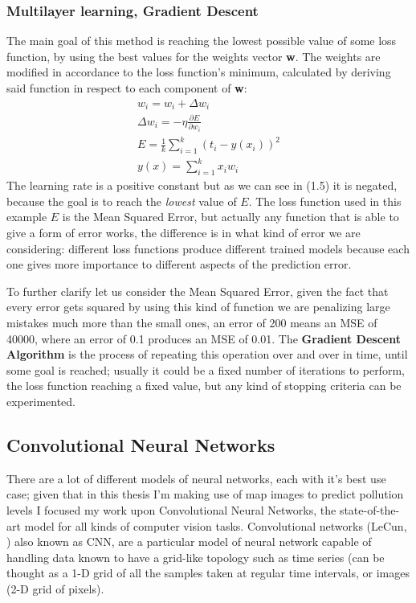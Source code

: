 \documentclass[11pt,a4paper,titlepage]{book}
\begin{document}
\subsubsection{Multilayer learning, Gradient Descent}
The main goal of this method is reaching the lowest possible value of some loss function, by using the best values for the weights vector \textbf{w}. The weights are modified in accordance to the loss function's minimum, calculated by deriving said function in respect to each component of \textbf{w}:
\begin{align}
    w_i = w_i + \Delta w_i \\
    \Delta w_i = - \eta \frac{\partial E}{\partial w_i} \\
    E = \frac{1}{k} \sum_{i=1}^{k}(t_i - y(x_i))^2 \\
    y(x) = \sum_{i=1}^{k}x_i w_i
\end{align}
The learning rate is a positive constant but as we can see in (1.5) it is negated, because the goal is to reach the \textit{lowest} value of $E$.
\newline
The loss function used in this example $E$ is the Mean Squared Error, but actually any function that is able to give a form of error works, the difference is in what kind of error we are considering: different loss functions produce different trained models because each one gives more importance to different aspects of the prediction error. 

To further clarify let us consider the Mean Squared Error, given the fact that every error gets squared by using this kind of function we are penalizing large mistakes much more than the small ones, an error of 200 means an MSE of 40000, where an error of 0.1 produces an MSE of 0.01. 
\newline
\newline
The \textbf{Gradient Descent Algorithm} is the process of repeating this operation over and over in time, until some goal is reached; usually it could be a fixed number of iterations to perform, the loss function reaching a fixed value, but any kind of stopping criteria can be experimented.

\subsection{Convolutional Neural Networks}
There are a lot of different models of neural networks, each with it's best use case; given that in this thesis I'm making use of map images to predict pollution levels I focused my work upon Convolutional Neural Networks, the state-of-the-art model for all kinds of computer vision tasks.
\newline
\newline
Convolutional networks (LeCun, \cite{lecun-bengio-95a}) also known as CNN, are a particular model of neural network capable of handling data known to have a grid-like topology such as time series (can be thought as a 1-D grid of all the samples taken at regular time intervals, or images (2-D grid of pixels).
\end{document}
